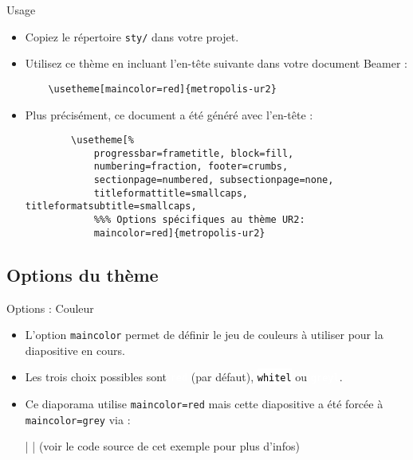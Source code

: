 \documentclass[10pt]{beamer}
\begin{document}
\begin{frame}[fragile]{Usage}
  \begin{itemize}
    \item Copiez le répertoire \texttt{sty/} dans votre projet.
  
    \item Utilisez ce thème en incluant l'en-tête suivante dans votre document Beamer :\medskip
  
    \begin{verbatim}
    \usetheme[maincolor=red]{metropolis-ur2}
    \end{verbatim}
    
    \medskip
    \item Plus précisément, ce document a été généré avec l'en-tête : \medskip
    
    \begin{beamercodeblock}\vspace{-.6em}
      \begin{verbatim}
        \usetheme[%
            progressbar=frametitle, block=fill,
            numbering=fraction, footer=crumbs,
            sectionpage=numbered, subsectionpage=none,
            titleformattitle=smallcaps, titleformatsubtitle=smallcaps,
            %%% Options spécifiques au thème UR2:
            maincolor=red]{metropolis-ur2}
      \end{verbatim}
    \end{beamercodeblock}
  \end{itemize}
\end{frame}

\subsection{Options du thème}

{
\begin{frame}[fragile,stretch=3]{Options : Couleur}

    \begin{itemize}
    \item L'option \texttt{maincolor} permet de définir le jeu de couleurs à utiliser pour la diapositive en cours.
    
    \item Les trois choix possibles sont \colorbox{ur2Rouge}{\textcolor{white}{\texttt{red}}} (par défaut), \colorbox{white}{\textcolor{black}{\texttt{white{\vphantom l}}}} ou \colorbox{ur2Gris}{\textcolor{white}{\texttt{grey{\vphantom l}}}}.

    \item Ce diaporama utilise \texttt{maincolor=red} mais cette diapositive a été forcée à \texttt{maincolor=grey} via :\medskip

          |   |
    \medskip
    (voir le code source de cet exemple pour plus d'infos)
    \end{itemize}
\end{frame}
}
\end{document}
